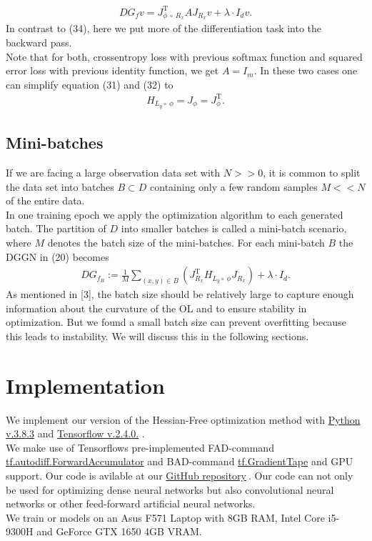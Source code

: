 \documentclass[conference]{IEEEtran}
\begin{document}
	\begin{align}
	DG_{f}v  = J_{\phi\:\circ\:R _{x}}^{\mathrm{T}}AJ_{R _{x}}v + \lambda\cdot I_{d}v.
	\end{align}
	In contrast to (34), here we put more of the differentiation task into the backward pass.\\
	Note that for both, crossentropy loss with previous softmax function and squared error loss with previous identity function, we get $A = I_{m}$. In these two cases one can simplify equation (31) and (32) to
	\begin{align}
	H_{L_{y}\circ\:\phi} = J_{\phi} = J_{\phi}^{\mathrm{T}}.
	\end{align}
	
	\subsection{Mini-batches}
	\noindent
	If we are facing a large observation data set with $N>>0$, it is common to split the data set into batches $B\subset D$ containing only a few random samples $M<<N$ of the entire data. \\
	In one training epoch we apply the optimization algorithm to each generated batch. The partition of $D$ into smaller batches is called a mini-batch scenario, where $M$ denotes the batch size of the mini-batches. For each mini-batch $B$ the DGGN in (20) becomes
	\begin{align}
	DG_{f_{B}} := \frac{1}{M}\sum_{(x, y)\in B}^{}\left(J_{R_{x}}^{\mathrm{T}}H_{L_{y}\circ\:\phi}J_{R_{x}}\right) + \lambda\cdot I_{d}.
	\end{align}
	As mentioned in [3], the batch size should be relatively large to capture enough information about the curvature of the OL and to ensure stability in optimization. But we found a small batch size can prevent overfitting because this leads to instability. We will discuss this in the following sections.
	
	
	
	\section {Implementation}
	\noindent
	We implement our version of the Hessian-Free optimization method with \href{https://www.python.org/}{Python v.3.8.3} and \href{https://www.tensorflow.org/}{Tensorflow v.2.4.0.} .
	\\We make use of Tensorflows pre-implemented FAD-command \href{https://www.tensorflow.org/api_docs/python/tf/autodiff/ForwardAccumulator}{tf.autodiff.ForwardAccumulator} and BAD-command \href{https://www.tensorflow.org/api_docs/python/tf/GradientTape}{tf.GradientTape} and GPU support. Our code is avilable at our \href{https://github.com/NiklasBrunn/Hessian_Free_Optimization_of_Deep_Neural_Networks}{GitHub repository}$\:$. Our code can not only be used for optimizing dense neural networks but also convolutional neural networks or other feed-forward artificial neural networks.
	\\We train or models on an Asus F571 Laptop with 8GB RAM, Intel Core i5-9300H and GeForce GTX 1650 4GB VRAM.
	
\end{document}
